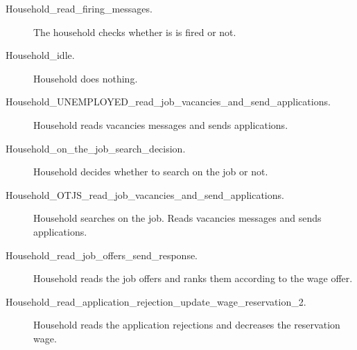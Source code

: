 \begin{description}
\item[Household\_read\_firing\_messages.] The household checks whether is is fired or
 not.
\item[Household\_idle.] Household does nothing.
\item[Household\_UNEMPLOYED\_read\_job\_vacancies\_and\_send\_applications.] Household reads vacancies messages and sends applications.
\item[Household\_on\_the\_job\_search\_decision.] Household decides whether to search on the job or not.
\item[Household\_OTJS\_read\_job\_vacancies\_and\_send\_applications.] Household
searches on the job. Reads vacancies messages and sends
applications.
\item[Household\_read\_job\_offers\_send\_response.] Household reads the job offers and ranks them
according to the wage offer.
\item[Household\_read\_application\_rejection\_update\_wage\_reservation\_2.] Household reads the application rejections and decreases the
reservation wage.
\end{description}


